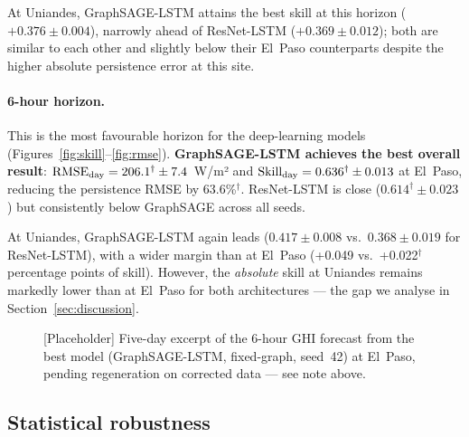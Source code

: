 At Uniandes, GraphSAGE-LSTM attains the best skill at this horizon
($+0.376 \pm 0.004$), narrowly ahead of ResNet-LSTM ($+0.369 \pm 0.012$); both
are similar to each other and slightly below their El~Paso counterparts despite
the higher absolute persistence error at this site.

\paragraph{6-hour horizon.}
This is the most favourable horizon for the deep-learning models
(Figures~\ref{fig:skill}--\ref{fig:rmse}).
\textbf{GraphSAGE-LSTM achieves the best overall result}: $\text{RMSE}_\text{day} = 206.1^\dagger \pm 7.4$~W/m²
and $\text{Skill}_\text{day} = 0.636^\dagger \pm 0.013$ at El~Paso, reducing the persistence RMSE by
63.6\%$^\dagger$. ResNet-LSTM is close ($0.614^\dagger \pm 0.023$) but consistently below GraphSAGE
across all seeds.

At Uniandes, GraphSAGE-LSTM again leads ($0.417 \pm 0.008$ vs.\ $0.368 \pm
0.019$ for ResNet-LSTM), with a wider margin than at El~Paso (+0.049 vs.\
+0.022$^\dagger$ percentage points of skill). However, the \emph{absolute} skill at
Uniandes remains markedly lower than at El~Paso for both architectures ---
the gap we analyse in Section~\ref{sec:discussion}.

\begin{figure}[t]
  \centering
  \caption{[Placeholder] Five-day excerpt of the 6-hour GHI forecast from the
           best model (GraphSAGE-LSTM, fixed-graph, seed~42) at El~Paso,
           pending regeneration on corrected data --- see note above.}
  \label{fig:ts}
\end{figure}

\subsection{Statistical robustness}

